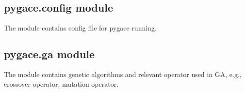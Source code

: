 \documentclass[letterpaper,10pt,english]{sphinxmanual}
\begin{document}
\subsection{pygace.config module}
\label{\detokenize{pygace:module-pygace.config}}\label{\detokenize{pygace:pygace-config-module}}
\sphinxAtStartPar
The module contains config file for pygace running.


\subsection{pygace.ga module}
\label{\detokenize{pygace:module-pygace.ga}}\label{\detokenize{pygace:pygace-ga-module}}
\sphinxAtStartPar
The module contains genetic algorithms and relevant operator used in GA, e.g.,
crossover operator, mutation operator.
\end{document}
